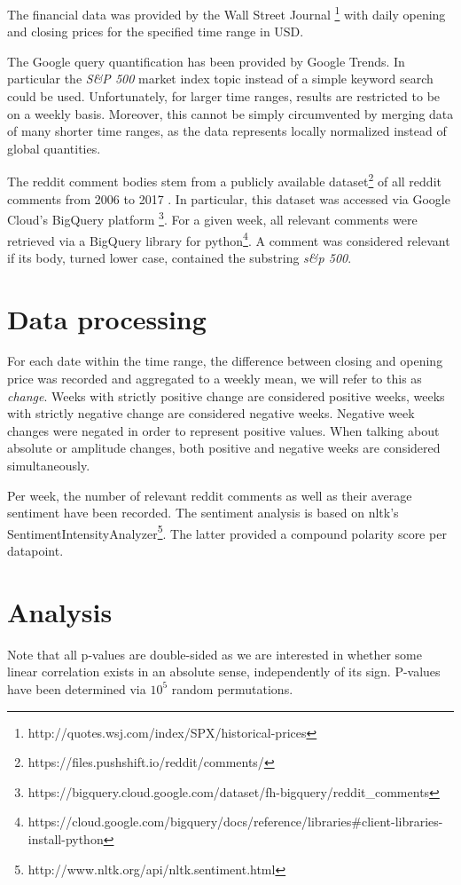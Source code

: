 \documentclass[12pt]{article}
\begin{document}
The financial data was provided by the Wall Street Journal \footnote{http://quotes.wsj.com/index/SPX/historical-prices} with daily opening and closing prices for the specified time range in USD.

The Google query quantification has been provided by Google Trends. In particular the \emph{S\&P 500} market index topic instead of a simple keyword search could be used. Unfortunately, for larger time ranges, results are restricted to be on a weekly basis. Moreover, this cannot be simply circumvented by merging data of many shorter time ranges, as the data represents locally normalized instead of global quantities. 

The reddit comment bodies stem from a publicly available dataset\footnote{https://files.pushshift.io/reddit/comments/} of all reddit comments from 2006 to 2017 . In particular, this dataset was accessed via Google Cloud's BigQuery platform \footnote{https://bigquery.cloud.google.com/dataset/fh-bigquery/reddit\_comments}. For a given week, all relevant comments were retrieved via a BigQuery library for python\footnote{https://cloud.google.com/bigquery/docs/reference/libraries\#client-libraries-install-python}. A comment was considered relevant if its body, turned lower case, contained the substring \emph{s\&p 500}. 

\section{Data processing}

For each date within the time range, the difference between closing and opening price was recorded and aggregated to a weekly mean, we will refer to this as \emph{change}. Weeks with strictly positive change are considered positive weeks, weeks with strictly negative change are considered negative weeks. Negative week changes were negated in order to represent positive values. When talking about absolute or amplitude changes, both positive and negative weeks are considered simultaneously.

Per week, the number of relevant reddit comments as well as their average sentiment have been recorded. The sentiment analysis is based on nltk's SentimentIntensityAnalyzer\footnote{http://www.nltk.org/api/nltk.sentiment.html}. The latter provided a compound polarity score per datapoint.

\section{Analysis}
Note that all p-values are double-sided as we are interested in whether some linear correlation exists in an absolute sense, independently of its sign. P-values have been determined via $10^5$ random permutations. 
\end{document}
